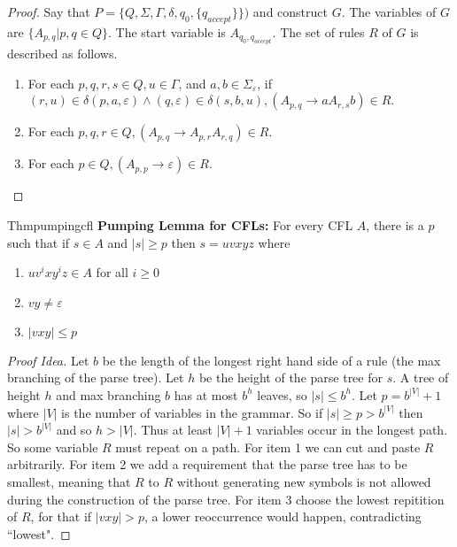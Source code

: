 \begin{proof}[Proof]
  Say that $P=\{Q,\Sigma,\Gamma,\delta,q_0,\{q_{accept}\}\})$ and construct $G$. The variables of $G$ are $\{A_{p,q}|p,q\in Q\}$. The start variable is $A_{q_0,q_{accept}}$. The set of rules $R$ of $G$ is described as follows.
  \begin{enumerate}
    \item For each $p,q,r,s\in Q,u\in \Gamma$, and $a,b\in \Sigma_{\varepsilon}$, if $(r,u)\in\delta(p,a,\varepsilon)\wedge (q,\varepsilon)\in \delta(s,b,u), (A_{p,q}\rightarrow aA_{r,s}b)\in R.$
    \item For each $p,q,r\in Q, (A_{p,q}\rightarrow A_{p,r}A_{r,q})\in R.$
    \item For each $p\in Q, (A_{p,p}\rightarrow \varepsilon)\in R.$\qedhere
  \end{enumerate}
\end{proof}

\begin{reference}{Thm}{pumpingcfl}
  \textbf{Pumping Lemma for CFLs:} For every CFL $A$, there is a $p$ such that if $s\in A$ and $|s|\geq p$ then $s=uvxyz$ where
  \begin{enumerate}
    \item $uv^ixy^iz\in A$ for all $i\geq 0$
    \item $vy\neq \varepsilon$
    \item $|vxy|\leq p$\qedhere
  \end{enumerate}
\end{reference}

\begin{proof}[Proof Idea]
  Let $b$ be the length of the longest right hand side of a rule (the max branching of the parse tree). Let $h$ be the height of the parse tree for $s$. A tree of height $h$ and max branching $b$ has at most $b^h$ leaves, so $|s|\leq b^h$. Let $p=b^{|V|}+1$ where $|V|$ is the number of variables in the grammar. So if $|s|\geq p>b^{|V|}$ then $|s|>b^{|V|}$ and so $h>|V|$. Thus at least $|V|+1$ variables occur in the longest path. So some variable $R$ must repeat on a path. For item 1 we can cut and paste $R$ arbitrarily. For item 2 we add a requirement that the parse tree has to be smallest, meaning that $R$ to $R$ without generating new symbols is not allowed during the construction of the parse tree. For item 3 choose the lowest repitition of $R$, for that if $|vxy|>p$, a lower reoccurrence would happen, contradicting ``lowest".
\end{proof}

